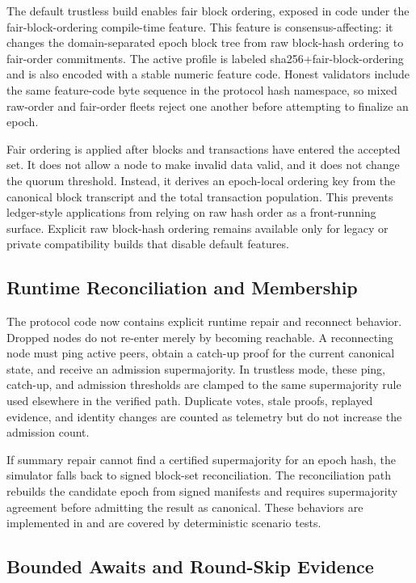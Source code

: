 The default trustless build enables fair block ordering, exposed in code under
the fair-block-ordering compile-time feature. This feature is
consensus-affecting: it changes the
domain-separated epoch block tree from raw block-hash ordering to fair-order
commitments. The active profile is labeled
sha256+fair-block-ordering and is also encoded with a stable numeric
feature code. Honest validators include the same feature-code byte sequence in
the protocol hash namespace, so mixed raw-order and fair-order fleets reject
one another before attempting to finalize an epoch.

Fair ordering is applied after blocks and transactions have entered the
accepted set. It does not allow a node to make invalid data valid, and it does
not change the quorum threshold. Instead, it derives an epoch-local ordering
key from the canonical block transcript and the total transaction population.
This prevents ledger-style applications from relying on raw hash order as a
front-running surface. Explicit raw block-hash ordering remains available only
for legacy or private compatibility builds that disable default features.

\subsection{Runtime Reconciliation and Membership}

The protocol code now contains explicit runtime repair and reconnect behavior.
Dropped nodes do not re-enter merely by becoming reachable. A reconnecting node
must ping active peers, obtain a catch-up proof for the current canonical state,
and receive an admission supermajority. In trustless mode, these ping,
catch-up, and admission thresholds are clamped to the same supermajority rule
used elsewhere in the verified path. Duplicate votes, stale proofs, replayed
evidence, and identity changes are counted as telemetry but do not increase the
admission count.

If summary repair cannot find a certified supermajority for an epoch hash, the
simulator falls back to signed block-set reconciliation. The reconciliation
path rebuilds the candidate epoch from signed manifests and requires
supermajority agreement before admitting the result as canonical. These
behaviors are implemented in  and are
covered by deterministic scenario tests.

\subsection{Bounded Awaits and Round-Skip Evidence}

